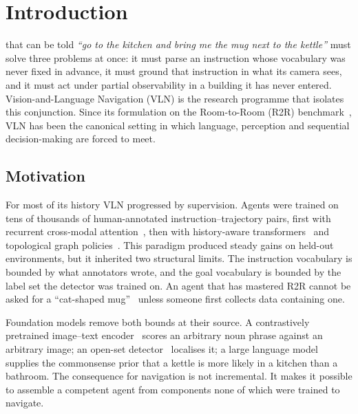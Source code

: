 \documentclass[journal]{IEEEtran}
\begin{document}
\section{Introduction}\label{sec:intro}

 that can be told \emph{``go to the kitchen and
bring me the mug next to the kettle''} must solve three problems at once:
it must parse an instruction whose vocabulary was never fixed in advance,
it must ground that instruction in what its camera sees, and it must act
under partial observability in a building it has never entered.
Vision-and-Language Navigation (VLN) is the research programme that isolates this
conjunction. Since its formulation on the Room-to-Room (R2R)
benchmark~\cite{anderson2018vision}, VLN has been the canonical setting in
which language, perception and sequential decision-making are forced to
meet.

\subsection{Motivation}
For most of its history VLN progressed by supervision. Agents were trained
on tens of thousands of human-annotated instruction--trajectory pairs,
first with recurrent cross-modal
attention~\cite{hong2021recurrent}, then with history-aware
transformers~\cite{chen2021history} and topological graph
policies~\cite{chen2022think}. This paradigm produced steady gains on
held-out environments, but it inherited two structural limits. The
instruction vocabulary is bounded by what annotators wrote, and the goal
vocabulary is bounded by the label set the detector was trained on. An
agent that has mastered R2R cannot be asked for a ``cat-shaped
mug''~\cite{dorbala2024embodied} unless someone first collects data
containing one.

Foundation models remove both bounds at their source. A contrastively
pretrained image--text encoder~\cite{radford2021learning} scores an
arbitrary noun phrase against an arbitrary image; an open-set
detector~\cite{liu2024grounding} localises it; a large language model
supplies the commonsense prior that a kettle is more likely in a kitchen
than a bathroom. The consequence for navigation is not incremental. It
makes it possible to assemble a competent agent from components none of
which were trained to navigate.
\end{document}
